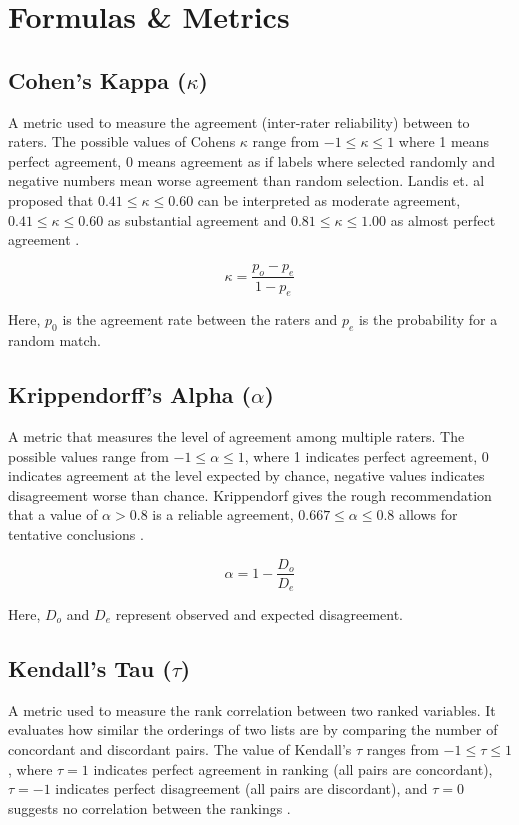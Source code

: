 \chapter{Formulas \& Metrics}

\section*{Cohen's Kappa ($\kappa$)}\label{sec:cohen-kappa}
A metric used to measure the agreement (inter-rater reliability) between to raters. The possible values of Cohens $\kappa$ range from $-1 \leq \kappa \leq 1$ where 1 means perfect agreement, 0 means agreement as if labels where selected randomly and negative numbers mean worse agreement than random selection. Landis et. al proposed that $0.41 \leq \kappa \leq 0.60$ can be interpreted as moderate agreement, $0.41 \leq \kappa \leq 0.60$ as substantial agreement and $0.81 \leq \kappa \leq 1.00$ as almost perfect agreement \cite{landis1977}.

\begin{equation}
  \kappa = \frac{p_o - p_e}{1 - p_e}
\end{equation}

Here, $p_0$ is the agreement rate between the raters and $p_e$ is the probability for a random match.


\section*{Krippendorff's Alpha ($\alpha$)}\label{sec:krippendorff-alpha}
A metric that measures the level of agreement among multiple raters. The possible values range from $-1 \leq \alpha \leq 1$, where 1 indicates perfect agreement, 0 indicates agreement at the level expected by chance, negative values indicates disagreement worse than chance. Krippendorf  gives the rough recommendation that a value of $\alpha > 0.8$ is a reliable agreement, $0.667 \leq \alpha \leq 0.8$ allows for tentative conclusions \cite{krippendorff2004}.

\begin{equation}
  \alpha = 1 - \frac{D_o}{D_e}
\end{equation}

Here, $D_o$ and $D_e$ represent observed and expected disagreement.


\section*{Kendall's Tau ($\tau$)}\label{sec:kendall-tau}
A metric used to measure the rank correlation between two ranked variables. It evaluates how similar the orderings of two lists are by comparing the number of concordant and discordant pairs. The value of Kendall’s $\tau$ ranges from $-1 \leq \tau \leq 1$, where $\tau = 1$ indicates perfect agreement in ranking (all pairs are concordant), $\tau = -1$ indicates perfect disagreement (all pairs are discordant), and $\tau = 0$ suggests no correlation between the rankings \cite{kendall1938}.

